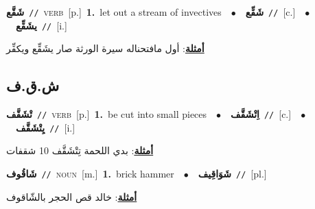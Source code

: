 \documentclass[10pt,a4paper,twoside]{article} %
\begin{document}
\begin{multicols}{2}
{\setlength\topsep{0pt}\textbf{\foreignlanguage{arabic}{شَقَّع}}\ {\color{gray}\texttt{//}\color{black}}\ \textsc{verb}\ [p.]\ \textbf{1.}~let out a stream of invectives\ \ $\bullet$\ \ \setlength\topsep{0pt}\textbf{\foreignlanguage{arabic}{شَقِّع}}\ {\color{gray}\texttt{//}\color{black}}\ [c.]\ \ $\bullet$\ \ \setlength\topsep{0pt}\textbf{\foreignlanguage{arabic}{يشَقِّع}}\ {\color{gray}\texttt{//}\color{black}}\ [i.]\  \begin{flushright}\color{gray}\foreignlanguage{arabic}{\textbf{\underline{\foreignlanguage{arabic}{أمثلة}}}: أول مافتحناله سيرة الورثة صار يشَقِّع ويكفِّر}\end{flushright}\color{black}} \vspace{2mm}

\vspace{-3mm}
\subsection*{\color{blue}\foreignlanguage{arabic}{ش.ق.ف}\color{blue}{}} 

{\setlength\topsep{0pt}\textbf{\foreignlanguage{arabic}{تْشَقَّف}}\ {\color{gray}\texttt{//}\color{black}}\ \textsc{verb}\ [p.]\ \textbf{1.}~be cut into small pieces\ \ $\bullet$\ \ \setlength\topsep{0pt}\textbf{\foreignlanguage{arabic}{اِتْشَقَّف}}\ {\color{gray}\texttt{//}\color{black}}\ [c.]\ \ $\bullet$\ \ \setlength\topsep{0pt}\textbf{\foreignlanguage{arabic}{يِتْشَقَّف}}\ {\color{gray}\texttt{//}\color{black}}\ [i.]\  \begin{flushright}\color{gray}\foreignlanguage{arabic}{\textbf{\underline{\foreignlanguage{arabic}{أمثلة}}}: بدي اللحمة تِتْشَقَّف 10 شقفات}\end{flushright}\color{black}} \vspace{2mm}

{\setlength\topsep{0pt}\textbf{\foreignlanguage{arabic}{شَاقُوف}}\ {\color{gray}\texttt{//}\color{black}}\ \textsc{noun}\ [m.]\ \textbf{1.}~brick hammer\ \ $\bullet$\ \ \setlength\topsep{0pt}\textbf{\foreignlanguage{arabic}{شَوَاقِيف}}\ {\color{gray}\texttt{//}\color{black}}\ [pl.]\  \begin{flushright}\color{gray}\foreignlanguage{arabic}{\textbf{\underline{\foreignlanguage{arabic}{أمثلة}}}: خالد قص الحجر بالشّاقوف}\end{flushright}\color{black}} \vspace{2mm}


\end{multicols}
\end{document}
